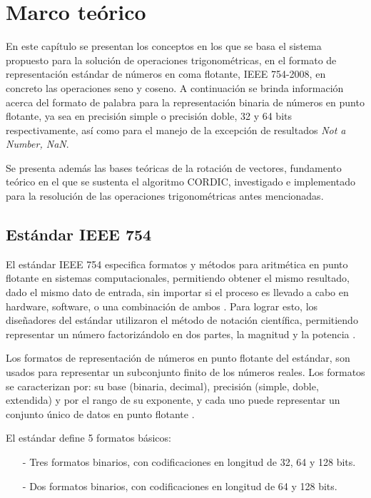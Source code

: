 \chapter{Marco teórico}
\label{ch:marco}

En este capítulo se presentan los conceptos en los que se basa el sistema propuesto para la solución de operaciones trigonométricas, en el formato de representación estándar de números en coma flotante, IEEE 754-2008, en concreto las operaciones seno y coseno. A continuación se brinda información acerca del formato de palabra para la representación binaria de números en punto flotante, ya sea en precisión simple o precisión doble, 32 y 64 bits respectivamente, así como para el manejo de la excepción de resultados \textit{Not a Number, NaN}.

Se presenta además las bases teóricas de la rotación de vectores, fundamento teórico en el que se sustenta el algoritmo CORDIC, investigado e implementado para la resolución de las operaciones trigonométricas antes mencionadas.


\section{Estándar IEEE 754}

El estándar IEEE 754 especifica formatos y métodos para aritmética en punto flotante en sistemas computacionales, permitiendo obtener el mismo resultado, dado el mismo dato de entrada, sin importar si el proceso es llevado a cabo en hardware, software, o una combinación de ambos \cite{IEEE754}. Para lograr esto, los diseñadores del estándar utilizaron el método de notación científica, permitiendo representar un número factorizándolo en dos partes, la magnitud y la potencia \cite{IEEE754_WEB}.

Los formatos de representación de números en punto flotante del estándar, son usados para representar un subconjunto finito de los números reales. Los formatos se caracterizan por: su base (binaria, decimal), precisión (simple, doble, extendida) y por el rango de su exponente, y cada uno puede representar un conjunto único de datos en punto flotante \cite{IEEE754}.

El estándar define 5 formatos básicos:

\begin{itemize}
	\item[-]	Tres formatos binarios, con codificaciones en longitud de 32, 64 y 128 bits.
	\item[-]	Dos formatos binarios, con codificaciones en longitud de 64 y 128 bits.
\end{itemize}

